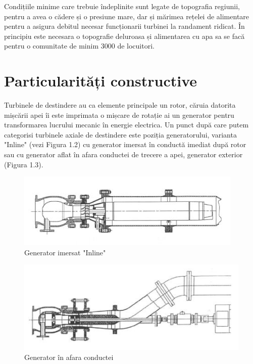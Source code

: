 Condițiile minime care trebuie îndeplinite sunt legate de topografia regiunii, pentru a avea o cădere și o presiune mare, dar și mărimea rețelei de alimentare pentru a asigura debitul necesar funcționarii turbinei la randament ridicat. În principiu este necesara o topografie deluroasa și alimentarea cu apa sa se facă pentru o comunitate de minim 3000 de locuitori.


\section{Particularități constructive}

Turbinele de destindere au ca elemente principale un rotor, căruia datorita mișcării apei îi este imprimata o mișcare de rotație ai un generator pentru transformarea lucrului mecanic în energie electrica. Un punct după care putem categorisi turbinele axiale de destindere este poziția generatorului, varianta "Inline" (vezi Figura 1.2) cu generator imersat în conductă imediat după rotor sau cu generator aflat în afara conductei de trecere a apei, generator exterior (Figura 1.3).

\begin{figure}[h!]
	\centering
	\includegraphics[scale=1.25]{figures/generator_inline.jpg}
	\caption{Generator imersat "Inline" \cite{GREES_2014}}
	\label{Generator imersat Inline}
\end{figure}

\begin{figure}[h!]
	\centering
	\includegraphics[scale=1.25]{figures/generator_in_afara_conductei.jpg}
	\caption{Generator în afara conductei \cite{GREES_2014}}
	\label{Generator în afara conductei}
\end{figure}


